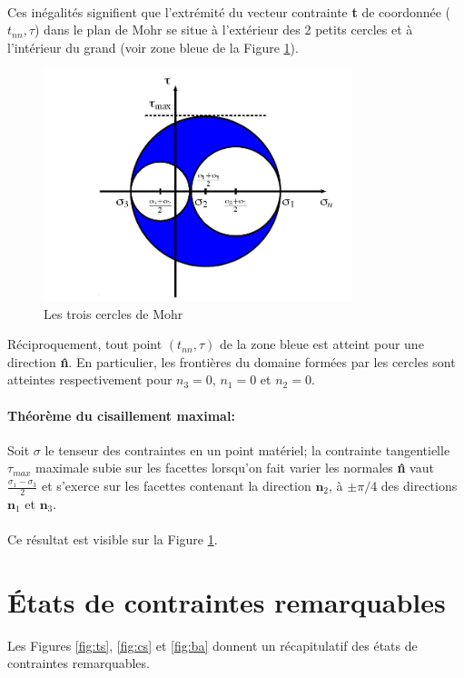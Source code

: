 \paragraph{}
Ces inégalités signifient que l'extrémité du vecteur contrainte \textbf{t} de coordonnée ($t_{nn},\tau$) dans le plan de Mohr se situe à l'extérieur des 2 petits cercles et à l'intérieur du grand (voir zone bleue de la Figure \ref{fig:mohr}).
\begin{figure}[!h]
\centering
\includegraphics[width = 0.8\textwidth]{./mohr}
\caption{Les trois cercles de Mohr}
\label{fig:mohr}
\end{figure}
Réciproquement, tout point $(t_{nn},\tau)$ de la zone bleue est atteint pour une direction \textbf{\^n}. En particulier, les frontières du domaine formées par les cercles sont atteintes respectivement pour $n_3=0$, $n_1=0$ et $n_2=0$.
\paragraph{Théorème du cisaillement maximal:} Soit $\sigma$ le tenseur des contraintes en un point
matériel; la contrainte tangentielle $\tau_{max}$ maximale subie sur les facettes lorsqu'on fait varier
les normales \textbf{\^n} vaut $\frac{\sigma_1-\sigma_3}{2}$ et s'exerce sur les facettes contenant la direction $\textbf{\^n}_2$, à  $\pm \pi/4$ des directions $\textbf{\^n}_1$ et $\textbf{\^n}_3$.
\paragraph{}
Ce résultat est visible sur la Figure \ref{fig:mohr}.

\section{\'Etats de contraintes remarquables}
Les Figures \ref{fig:ts}, \ref{fig:cs} et \ref{fig:ba} donnent un récapitulatif des états de contraintes remarquables.

